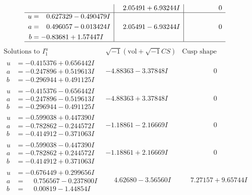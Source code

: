 \documentclass[1p]{elsarticle_modified}
\theoremstyle{definition}
\newcommand{\I}{\sqrt{-1}}
\begin{document}
$$\begin{array}{c|c|c}
 & \phantom{-}2.05491 + 6.93244 I & \phantom{-0.000000 } 0 \\ \hline\begin{aligned}
u &= \phantom{-}0.627329 - 0.490479 I \\
a &= \phantom{-}0.496057 - 0.013424 I \\
b &= -0.83681 + 1.57447 I\end{aligned}
 & \phantom{-}2.05491 - 6.93244 I & \phantom{-0.000000 } 0\\
 \hline 
 \end{array}$$\newpage$$\begin{array}{c|c|c}  
\text{Solutions to }I^u_{1}& \I (\text{vol} + \sqrt{-1}CS) & \text{Cusp shape}\\
 \hline 
\begin{aligned}
u &= -0.415376 + 0.656442 I \\
a &= -0.247896 + 0.519613 I \\
b &= -0.296944 + 0.491125 I\end{aligned}
 & -4.88363 - 3.37848 I & \phantom{-0.000000 } 0 \\ \hline\begin{aligned}
u &= -0.415376 - 0.656442 I \\
a &= -0.247896 - 0.519613 I \\
b &= -0.296944 - 0.491125 I\end{aligned}
 & -4.88363 + 3.37848 I & \phantom{-0.000000 } 0 \\ \hline\begin{aligned}
u &= -0.599038 + 0.447390 I \\
a &= -0.782862 - 0.244572 I \\
b &= -0.414912 - 0.371063 I\end{aligned}
 & -1.18861 - 2.16669 I & \phantom{-0.000000 } 0 \\ \hline\begin{aligned}
u &= -0.599038 - 0.447390 I \\
a &= -0.782862 + 0.244572 I \\
b &= -0.414912 + 0.371063 I\end{aligned}
 & -1.18861 + 2.16669 I & \phantom{-0.000000 } 0 \\ \hline\begin{aligned}
u &= -0.676449 + 0.299656 I \\
a &= \phantom{-}0.756567 - 0.237800 I \\
b &= \phantom{-}0.00819 - 1.44854 I\end{aligned}
 & \phantom{-}4.62680 - 3.56560 I & \phantom{-}7.27157 + 9.65744 I \\ \hline\begin{aligned}

\end{aligned}
\end{array}$$
\end{document}
